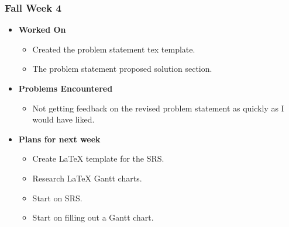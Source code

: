 \documentclass{article}
\begin{document}
\subsubsection{Fall Week 4}
\begin{itemize}
    \item {\textbf{Worked On}}
    \begin{itemize}
        \item Created the problem statement tex template.
        \item The problem statement proposed solution section.
    \end{itemize}

    \item {\textbf{Problems Encountered}}
    \begin{itemize}
        \item Not getting feedback on the revised problem statement as quickly as I would have liked.
    \end{itemize}
    \item{\textbf{Plans for next week}}
    \begin{itemize}
        \item Create LaTeX template for the SRS.
        \item Research LaTeX Gantt charts.
        \item Start on SRS.
        \item Start on filling out a Gantt chart.
    \end{itemize}


\end{itemize}
\end{document}
